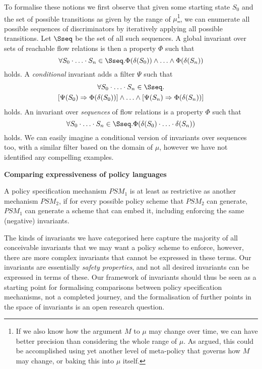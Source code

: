 To formalise these notions we first observe that given some starting state $S_0$ and the set of possible
transitions as given by the range of $\mu$\footnote{If we also know how the argument $M$ to $\mu$ may change
over time, we can have better precision than considering the whole range of $\mu$. As argued, this could
be accomplished using yet another level of meta-policy that governs how $M$ may change, or baking this into
$\mu$ itself.}, we can enumerate all possible sequences
of discriminators by iteratively applying all possible transitions. Let $\Sseq$
be the set of all such sequences. A global invariant over sets of reachable flow relations is then a property $\Phi$
such that 
\[
  \forall{S_0 \cdot \ldots \cdot S_n} \in \Sseq . \Phi(\delta(S_0)) \land \ldots \land \Phi(\delta(S_n))
\] holds. A \emph{conditional} invariant adds a filter $\Psi$ such that
\begin{multline*}
  \forall{S_0 \cdot \ldots \cdot S_n} \in \Sseq . \\
    [\Psi(S_0) \Rightarrow \Phi(\delta(S_0))] \land \ldots \land [\Psi(S_n) \Rightarrow \Phi(\delta(S_n))]
\end{multline*}
holds.  An invariant over \emph{sequences} of flow relations is a property $\Phi$ such that
\[
  \forall{S_0 \cdot \ldots \cdot S_n} \in \Sseq . \Phi(\delta(S_0) \cdot \ldots \cdot \delta(S_n))
\] holds. We can easily imagine a conditional version of invariants over sequences too, with a similar filter
based on the domain of $\mu$, however we have not identified any compelling examples.

\begin{framed}
\centerline{\bf Comparing expressiveness of policy languages}
\noindent
A policy specification mechanism $PSM_1$ is at least as restrictive
as another mechanism $PSM_2$, if for every possible policy scheme that $PSM_2$ can generate,
$PSM_1$ can generate a scheme that can embed it, including enforcing the same (negative)
invariants.
\end{framed}


The kinds of invariants we have categorised here capture the majority of all conceivable invariants
that we may want a policy scheme to enforce, however, there are more complex invariants that
cannot be expressed in these terms. Our invariants are essentially \emph{safety properties}, 
and not all desired invariants can be expressed in terms of these. 
Our framework of invariants should thus be seen as a starting point for
formalising comparisons between policy specification mechanisms, not a completed journey,
and the formalisation of further points in the space of invariants is an open research question.

























